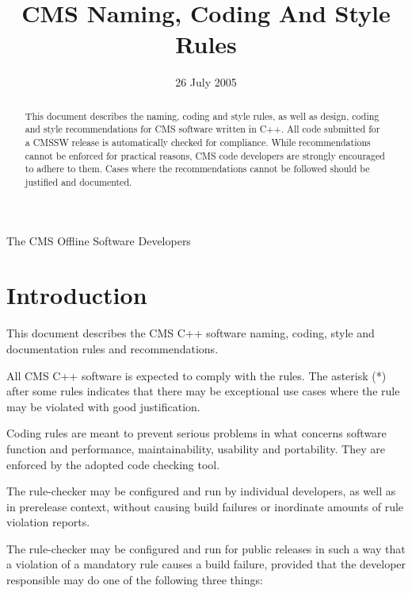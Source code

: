 \documentclass{cmspaper}
\begin{document}
\begin{titlepage}

\date{26 July 2005}

\title{CMS Naming, Coding And Style Rules}

\begin{Authlist}
The CMS Offline Software Developers
\end{Authlist}

\begin{abstract}

This document describes the naming, coding and style rules, as well as
design, coding and style recommendations for CMS software
written in C++. 
All code submitted for a CMSSW release is automatically checked for
compliance. 
While recommendations cannot be enforced for practical reasons, CMS
code developers are strongly encouraged to adhere to them. Cases
where the recommendations cannot be followed should be justified and
documented.
   
\end{abstract} 

\end{titlepage}

\setcounter{page}{2}

\section{Introduction}

This document describes the CMS C++ software naming, coding, style and 
documentation rules and recommendations.

All CMS C++ software is expected to comply with the rules. The asterisk (*) 
after some rules indicates that there may be exceptional use cases where 
the rule may be violated with good justification.

Coding rules are meant to prevent serious problems in what concerns software 
function and performance, maintainability, usability and portability.
They are enforced by the adopted code checking tool.

The rule-checker may be configured and run by individual developers, 
as well as in prerelease context, without causing build failures or 
inordinate amounts of rule violation reports.

The rule-checker may be configured and run for public releases in such a 
way that a violation of a mandatory rule causes a build failure, provided 
that the developer responsible may do one of the following three things:
	
\end{document}
